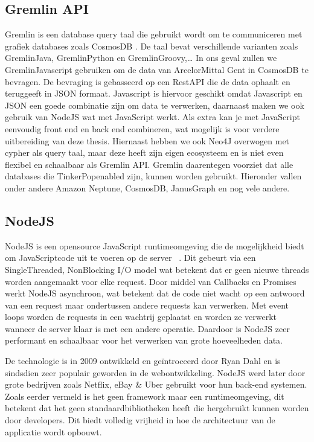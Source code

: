\subsection{Gremlin API}
Gremlin is een database query taal die gebruikt wordt om te communiceren met grafiek databases zoals CosmosDB \autocite{Tinkerpop2023}.\@
De taal bevat verschillende varianten zoals Gremlin\-Java, Gremlin\-Python en Gremlin\-Groovy,\dots
In ons geval zullen we Gremlin\-Javascript gebruiken om de data van ArcelorMittal Gent in CosmosDB te bevragen. De bevraging is gebasseerd op een RestAPI die de data ophaalt en teruggeeft in JSON formaat.
Javascript is hiervoor geschikt omdat Javascript en JSON een goede combinatie zijn om data te verwerken, daarnaast maken we ook gebruik van NodeJS wat met JavaScript werkt. 
Als extra kan je met JavaScript eenvoudig front end en back end combineren, wat mogelijk is voor verdere uitbereiding van deze thesis.
Hiernaast hebben we ook Neo4J overwogen met cypher als query taal, maar deze heeft zijn eigen ecosysteem en is niet even flexibel en schaalbaar als Gremlin API.\@
Gremlin daarentegen voorziet dat alle databases die TinkerPop\-enabled zijn, kunnen worden gebruikt. Hieronder vallen onder andere Amazon Neptune, CosmosDB, JanusGraph en nog vele andere.\autocite{Tinkerpop2023a}

\subsection{NodeJS}
NodeJS is een open\-source JavaScript runtime\-omgeving die de mogelijkheid biedt om JavaScript\-code uit te voeren op de server ~\autocite{NodeJS2022}.
Dit gebeurt via een Single\-Threaded, Non\-Blocking I/O model wat betekent dat er geen nieuwe threads worden aangemaakt voor elke request.
Door middel van Callbacks en Promises werkt NodeJS asynchroon, wat betekent dat de code niet wacht op een antwoord van een request maar ondertussen andere requests kan verwerken.
Met event loops worden de requests in een wachtrij geplaatst en worden ze verwerkt wanneer de server klaar is met een andere operatie.
Daardoor is NodeJS zeer performant en schaalbaar voor het verwerken van grote hoeveelheden data.

De technologie is in 2009 ontwikkeld en geïntroceerd door Ryan Dahl en is sindsdien zeer populair geworden in de webontwikkeling. 
NodeJS werd later door grote bedrijven zoals Netflix, eBay \& Uber gebruikt voor hun back-end systemen.
Zoals eerder vermeld is het geen framework maar een runtime\-omgeving, dit betekent dat het geen standaardbibliotheken heeft die hergebruikt kunnen worden door developers.
Dit biedt volledig vrijheid in hoe de architectuur van de applicatie wordt opbouwt.

